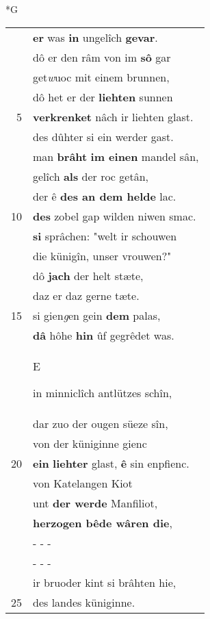 \documentclass[8pt,a4paper,notitlepage]{article}
\begin{document}
\newpage
\begin{table}[ht]
\begin{minipage}[t]{0.5\linewidth}
\small
\begin{center}*G
\end{center}
\begin{tabular}{rl}
 & \textbf{er} was \textbf{in} ungelîch \textbf{gevar}.\\ 
 & dô er den râm von im \textbf{sô} gar\\ 
 & get\textit{w}uoc mit einem brunnen,\\ 
 & dô het er der \textbf{liehten} sunnen\\ 
5 & \textbf{verkrenket} nâch ir liehten glast.\\ 
 & des dûhter si ein werder gast.\\ 
 & man \textbf{brâht} \textbf{im einen} mandel sân,\\ 
 & gelîch \textbf{als} der roc getân,\\ 
 & der ê \textbf{des an dem helde} lac.\\ 
10 & \textbf{des} zobel gap wilden niwen smac.\\ 
 & \textbf{si} sprâchen: "welt ir schouwen\\ 
 & die künigîn, unser vrouwen?"\\ 
 & dô \textbf{jach} der helt stæte,\\ 
 & daz er daz gerne tæte.\\ 
15 & si gien\textit{g}en gein \textbf{dem} palas,\\ 
 & \textbf{dâ} hôhe \textbf{hin} ûf gegrêdet was.\\ 
 & \begin{large}E\end{large}in minniclîch antlützes schîn,\\ 
 & dar zuo der ougen süeze sîn,\\ 
 & von der küniginne gienc\\ 
20 & \textbf{ein} \textbf{liehter} glast, \textbf{ê} sin enpfienc.\\ 
 & von Katelangen Kiot\\ 
 & unt \textbf{der werde} Manfiliot,\\ 
 & \textbf{herzogen bêde wâren die},\\ 
 & \multicolumn{1}{l}{ - - - }\\ 
 & \multicolumn{1}{l}{ - - - }\\ 
 & ir bruoder kint si brâhten hie,\\ 
25 & des landes küniginne.\\ 

\end{tabular}
\end{minipage}
\end{table}
\end{document}

